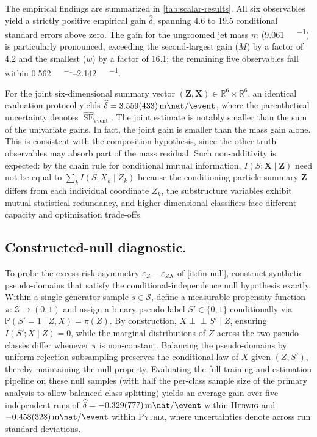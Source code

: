 \documentclass[12pt]{article}
\newcommand{\Prb}{\mathbb{P}}
\newcommand{\indep}{\perp\!\!\!\perp}
\newcommand{\Gens}{\mathcal{S}}
\newcommand{\1}{\mathbbm{1}}
\renewcommand{\[}{\begin{equation}}
\renewcommand{\]}{\end{equation}}
\begin{document}
    The empirical findings are summarized in \cref{tab:scalar-results}.
    All six observables yield a strictly positive empirical gain \(\widehat{\delta}\), spanning \num{4.6} to \num{19.5} conditional standard errors above zero.
    The gain for the ungroomed jet mass \(m\) (\qty{9.061}{\milli\nat\per\event}) is particularly pronounced, exceeding the second-largest gain (\(M\)) by a factor of \num{4.2} and the smallest (\(w\)) by a factor of \num{16.1}; the remaining five observables fall within \qtyrange{0.562}{2.142}{\milli\nat\per\event}.

    For the joint six-dimensional summary vector \((\mathbf{Z}, \mathbf{X}) \in \mathbb{R}^6 \times \mathbb{R}^6\), an identical evaluation protocol yields \(\widehat{\delta} = \qty{3.559(433)}{\milli\nat\per\event}\), where the parenthetical uncertainty denotes \(\widehat{\operatorname{SE}}_{\mathrm{event}}\).
    The joint estimate is notably smaller than the sum of the univariate gains.
    In fact, the joint gain is smaller than the mass gain alone.
    This is consistent with the composition hypothesis, since the other truth observables may absorb part of the mass residual.
    Such non-additivity is expected: by the chain rule for conditional mutual information, \(I(S; \mathbf{X} \mid \mathbf{Z}) \) need not be equal to \( \sum_k I(S; X_k \mid Z_k)\) because the conditioning particle summary \(\mathbf{Z}\) differs from each individual coordinate \(Z_k\), the substructure variables exhibit mutual statistical redundancy, and higher dimensional classifiers face different capacity and optimization trade-offs.

    \subsection{Constructed-null diagnostic.}

    To probe the excess-risk asymmetry \(\varepsilon_Z - \varepsilon_{ZX}\) of \cref{it:fin-null}, construct synthetic pseudo-domains that satisfy the conditional-independence null hypothesis exactly.
    Within a single generator sample \(s \in \Gens\), define a measurable propensity function \(\pi \colon \mathcal{Z} \to (0, 1)\) and assign a binary pseudo-label \(S' \in \{0, 1\}\) conditionally via \(\Prb(S' = 1 \mid Z, X) = \pi(Z)\).
    By construction, \(X \indep S' \mid Z\), ensuring \(I(S'; X \mid Z) = 0\), while the marginal distributions of \(Z\) across the two pseudo-classes differ whenever \(\pi\) is non-constant.
    Balancing the pseudo-domains by uniform rejection subsampling preserves the conditional law of \(X\) given \((Z, S')\), thereby maintaining the null property.
    Evaluating the full training and estimation pipeline on these null samples (with half the per-class sample size of the primary analysis to allow balanced class splitting) yields an average gain over five independent runs of \(\widehat{\delta} = \qty{-0.329(777)}{\milli\nat\per\event}\) within \textsc{Herwig} and \(\qty{-0.458(328)}{\milli\nat\per\event}\) within \textsc{Pythia}, where uncertainties denote across run standard deviations.
\end{document}
